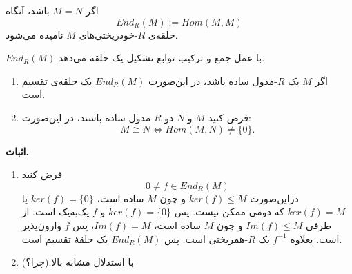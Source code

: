 \begin{frame}
    \begin{definition}
        اگر \( M = N \) باشد، آنگاه
        \[
            End_R(M) := Hom(M,M)
        \]
        حلقه‌ی \( R \)-خودریختی‌های \( M \) نامیده می‌شود.


    \end{definition}
    \begin{remark}
        \( End_R(M) \) با عمل جمع و ترکیب توابع تشکیل یک حلقه‌  می‌دهد.
    \end{remark}

\end{frame}

\begin{frame}
    \begin{lemma}[{لم شُر:}]
        \begin{enumerate}
            \item اگر \( M \) یک \( R \)-مدول ساده باشد، در این‌صورت \( End_R(M) \) یک حلقه‌ی تقسیم است.
            \item فرض کنید \( M \) و \( N \) دو \( R \)-مدول ساده باشند، در این‌صورت:
                  \[
                      M \cong N \iff Hom(M,N) \neq \{0\}.
                  \]
        \end{enumerate}
    \end{lemma}


    \textbf{اثبات.}
    \begin{tblock}{}
        \begin{enumerate}
            \item فرض کنید
                  \[
                      0 \neq f \in End_R(M)
                  \]
                  دراین‌صورت
                  \(ker (f) \leqslant M\)
                  و چون
                  \( M \) ساده است، \(ker (f) = \{0\}\) یا
                  \(ker (f) = M\) که دومی ممکن نیست. پس
                  \(ker (f) = \{0\}\) و \( f \) یک‌به‌یک است. از طرفی
                  \(Im (f) \leqslant M\) و چون \( M \) ساده است،
                  \(Im (f) = M\)، پس
                  \( f \)
                  وارون‌پذیر
                  است.
                  بعلاوه
                  \( f^{-1} \)
                  یک
                  \(R\)-همریختی
                  است. پس
                  \( End_R(M) \)
                  یک حلقهٔ تقسیم است.
            \item با استدلال مشابه بالا.(چرا؟)
        \end{enumerate}
    \end{tblock}

\end{frame}



